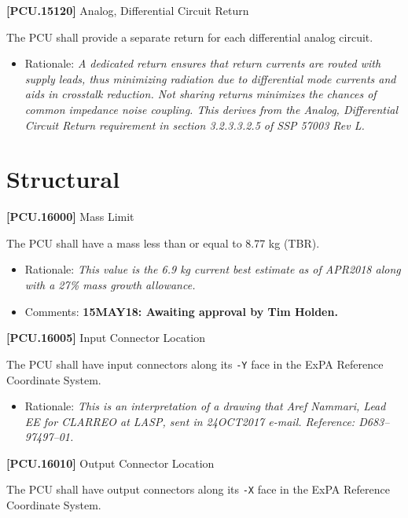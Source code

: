 \textbf{[PCU.15120]} Analog, Differential Circuit Return

The \gls{PCU} shall provide a separate return for each differential analog circuit.

\begin{itemize}
\item{} Rationale: \emph{A dedicated return ensures that return currents are routed with supply leads, thus minimizing radiation due to differential mode currents and aids in crosstalk reduction. Not sharing returns minimizes the chances of common impedance noise coupling. This derives from the Analog, Differential Circuit Return requirement in section 3.2.3.3.2.5 of SSP 57003 Rev L.}

\end{itemize}

\section{Structural}
\label{structural}

\textbf{[PCU.16000]} Mass Limit

The \gls{PCU} shall have a mass less than or equal to 8.77 kg (TBR\label{tbx_11}).

\begin{itemize}
\item{} Rationale: \emph{This value is the 6.9 kg current best estimate as of APR2018 along with a 27\% mass growth allowance.}

\item{} Comments: \textbf{15MAY18: Awaiting approval by Tim Holden.}

\end{itemize}

\textbf{[PCU.16005]} Input Connector Location

The \gls{PCU} shall have input connectors along its \texttt{-Y} face in the \gls{ExPA} Reference Coordinate System.

\begin{itemize}
\item{} Rationale: \emph{This is an interpretation of a drawing that Aref Nammari, Lead EE for CLARREO at LASP, sent in 24OCT2017 e-mail. Reference: D683--97497--01.}

\end{itemize}

\textbf{[PCU.16010]} Output Connector Location

The \gls{PCU} shall have output connectors along its \texttt{-X} face in the \gls{ExPA} Reference Coordinate System.

